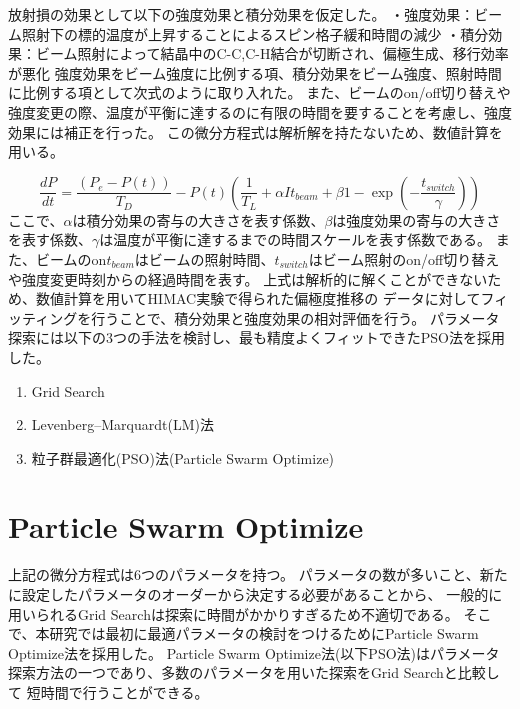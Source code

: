 \documentclass[a5j]{jsarticle}
\begin{document}
放射損の効果として以下の強度効果と積分効果を仮定した。
・強度効果：ビーム照射下の標的温度が上昇することによるスピン格子緩和時間の減少
・積分効果：ビーム照射によって結晶中のC-C,C-H結合が切断され、偏極生成、移行効率が悪化
強度効果をビーム強度に比例する項、積分効果をビーム強度、照射時間に比例する項として次式のように取り入れた。
また、ビームのon/off切り替えや強度変更の際、温度が平衡に達するのに有限の時間を要することを考慮し、強度効果には補正を行った。
この微分方程式は解析解を持たないため、数値計算を用いる。

\begin{equation}
  \frac{dP}{dt}=\frac{(P_e-P(t))}{T_D}-P(t)(\frac{1}{T_L}+\alpha I t_{beam}+\beta{1-\exp(-\frac{t_{switch}}{\gamma})})
\end{equation}
ここで、$\alpha$は積分効果の寄与の大きさを表す係数、$\beta$は強度効果の寄与の大きさを表す係数、$\gamma$は温度が平衡に達するまでの時間スケールを表す係数である。
また、ビームのon$t_{beam}$はビームの照射時間、$t_{switch}$はビーム照射のon/off切り替えや強度変更時刻からの経過時間を表す。
上式は解析的に解くことができないため、数値計算を用いてHIMAC実験で得られた偏極度推移の
データに対してフィッティングを行うことで、積分効果と強度効果の相対評価を行う。
パラメータ探索には以下の3つの手法を検討し、最も精度よくフィットできたPSO法を採用した。
\begin{enumerate}
  \item Grid Search
  \item Levenberg–Marquardt(LM)法
  \item 粒子群最適化(PSO)法(Particle Swarm Optimize)
\end{enumerate}

\section{Particle Swarm Optimize}

上記の微分方程式は6つのパラメータを持つ。
パラメータの数が多いこと、新たに設定したパラメータのオーダーから決定する必要があることから、
一般的に用いられるGrid Searchは探索に時間がかかりすぎるため不適切である。
そこで、本研究では最初に最適パラメータの検討をつけるためにParticle Swarm Optimize法を採用した。
Particle Swarm Optimize法(以下PSO法)はパラメータ探索方法の一つであり、多数のパラメータを用いた探索をGrid Searchと比較して
短時間で行うことができる。
\end{document}
